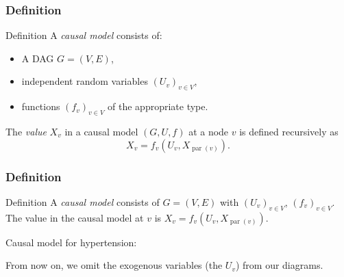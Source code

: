 \documentclass{beamer}
\DeclareMathOperator{\Par}{par}
\begin{document}
\begin{frame}
    \frametitle{Definition}
    \begin{block}{Definition}
    A \emph{causal model} consists of:
    \begin{itemize}
        \item A DAG $G = (V, E)$,
        \item independent random variables $(U_v)_{v \in V}$,
        \item functions $(f_v)_{v \in V}$ of the appropriate type.
    \end{itemize}
    The \emph{value} $X_v$ in a causal model $(G, U, f)$ at a node $v$ is
    defined recursively as
    \[
        X_v = f_v(U_v, X_{\Par(v)}).
    \]
    \end{block}
\end{frame}

\begin{frame}
    \frametitle{Definition}
    \begin{block}{Definition}
        A \emph{causal model} consists of $G = (V, E)$ with $(U_v)_{v \in V}$,
        $(f_v)_{v \in V}$. The value in the causal model at $v$ is $X_v
        = f_v(U_v, X_{\Par(v)})$.
    \end{block}
    Causal model for hypertension:
    \begin{center}
    \end{center}
    From now on, we omit the exogenous variables (the $U_v$) from our diagrams.
\end{frame}
\end{document}
